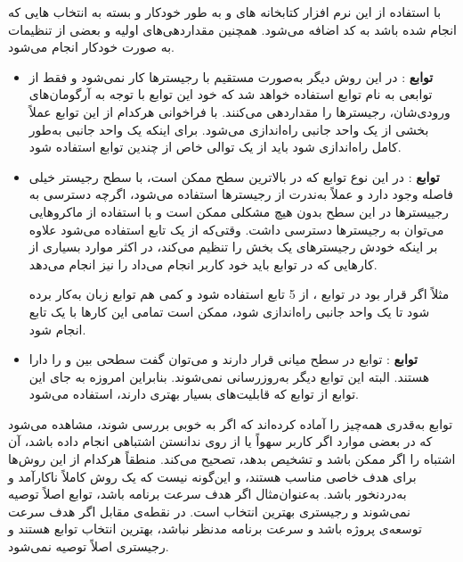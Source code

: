 \newpage
با استفاده از این نرم افزار کتابخانه های  و  به طور خودکار و بسته به انتخاب هایی که انجام شده باشد به کد اضافه می‌شود. همچنین مقداردهی‌های اولیه و بعضی از تنظیمات به صورت خودکار انجام می‌شود.
\begin{itemize}
	\item \textbf{توابع }: در این روش دیگر به‌صورت مستقیم با رجیسترها کار نمی‌شود و فقط از توابعی به نام توابع  استفاده خواهد شد که خود این توابع با توجه به آرگومان‌های ورودی‌شان، رجیسترها را مقداردهی می‌کنند. با فراخوانی هرکدام از این توابع عملاً بخشی از یک واحد جانبی راه‌اندازی می‌شود. برای اینکه یک واحد جانبی به‌طور کامل راه‌اندازی شود باید از یک توالی خاص از چندین توابع  استفاده شود.
	
	\item \textbf{توابع }: در این نوع توابع که در بالاترین سطح ممکن است، با سطح رجیستر خیلی فاصله‌ وجود دارد و عملاً به‌ندرت از رجیسترها استفاده می‌شود، اگرچه دسترسی به رجییسترها در این سطح بدون هیچ مشکلی ممکن است و با استفاده از ماکروهایی می‌توان به رجیسترها دسترسی داشت. وقتی‌که از یک تابع  استفاده می‌شود علاوه بر اینکه خودش رجیسترهای یک بخش را تنظیم می‌کند، در اکثر موارد بسیاری از کارهایی که در توابع  باید خود کاربر انجام می‌داد را نیز انجام می‌دهد.
	
	مثلاً اگر قرار بود در توابع ، از 5 تابع استفاده شود و کمی هم توابع زبان  به‌کار برده شود تا یک واحد جانبی راه‌اندازی شود، ممکن است تمامی این کارها با یک تابع  انجام شود.
	\item \textbf{توابع }: توابع  در سطح میانی قرار دارند و می‌توان گفت سطحی بین  و  را دارا هستند. البته این توابع دیگر به‌روزرسانی نمی‌شوند. بنابراین امروزه به جای این توابع از توابع  که قابلیت‌های بسیار بهتری دارند، استفاده می‌شود.
	
\end{itemize}

توابع  به‌قدری همه‌چیز را آماده کرده‌اند که اگر به خوبی بررسی شوند، مشاهده می‌شود که در بعضی موارد اگر کاربر سهواً یا از روی ندانستن اشتباهی انجام داده باشد، آن اشتباه را اگر ممکن باشد و تشخیص بدهد، تصحیح می‌کند. منطقاً هرکدام از این روش‌ها برای هدف خاصی مناسب هستند، و این‌گونه نیست که یک روش کاملاً ناکارآمد و به‌دردنخور باشد. به‌عنوان‌مثال اگر هدف سرعت برنامه باشد، توابع  اصلاً توصیه نمی‌شوند و رجیستری بهترین انتخاب است. در نقطه‌ی مقابل اگر هدف سرعت توسعه‌ی پروژه باشد و سرعت برنامه مدنظر نباشد، بهترین انتخاب توابع  هستند و رجیستری اصلاً توصیه نمی‌شود.
\newpage
